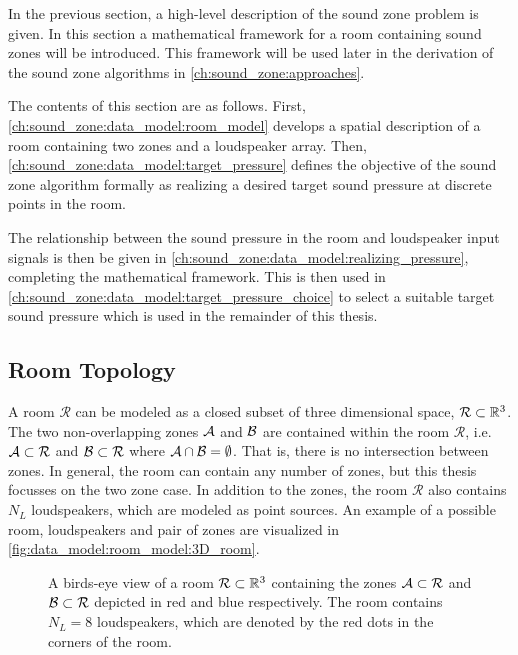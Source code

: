 In the previous section, a high-level description of the sound zone problem is given.
In this section a mathematical framework for a room containing sound zones will be introduced.
This framework will be used later in the derivation of the sound zone algorithms in \autoref{ch:sound_zone:approaches}.

The contents of this section are as follows.
First, \autoref{ch:sound_zone:data_model:room_model} develops a spatial description of a room containing
two zones and a loudspeaker array.
Then, \autoref{ch:sound_zone:data_model:target_pressure} defines the objective of the sound zone algorithm formally
as realizing a desired target sound pressure at discrete points in the room.

The relationship between the sound pressure in the room and loudspeaker input signals is then be given in
\autoref{ch:sound_zone:data_model:realizing_pressure}, completing the mathematical framework.
This is then used in \autoref{ch:sound_zone:data_model:target_pressure_choice} to select a suitable target
sound pressure which is used in the remainder of this thesis.

\subsection{Room Topology}
\label{ch:sound_zone:data_model:room_model}
A room $\mathcal{R}$ can be modeled as a closed subset of three dimensional space, $\mathcal{R} \subset \mathbb{R}^{3}$.
The two non-overlapping zones $\mathcal{A}$ and $\mathcal{B}$ are contained within the room $\mathcal{R}$, 
i.e. $\mathcal{A} \subset \mathcal{R}$ and $\mathcal{B} \subset \mathcal{R}$ where $\mathcal{A} \cap \mathcal{B} = \emptyset$.
That is, there is no intersection between zones.
In general, the room can contain any number of zones, but this thesis focusses on the two zone case. 
In addition to the zones, the room $\mathcal{R}$ also contains $N_L$ loudspeakers, which are modeled as point sources.
An example of a possible room, loudspeakers and pair of zones are visualized in \autoref{fig:data_model:room_model:3D_room}.

\begin{figure}
    \centering
    
    \caption{A birds-eye view of a room $\mathcal{R}\subset \mathbb{R}^{3}$ containing the zones $\mathcal{A}\subset\mathcal{R}$ 
    and $\mathcal{B}\subset\mathcal{R}$ depicted in red and blue respectively. 
    The room contains $N_L = 8$ loudspeakers, which are denoted by the red dots in the corners of the room.}
    \label{fig:data_model:room_model:3D_room}
\end{figure}

